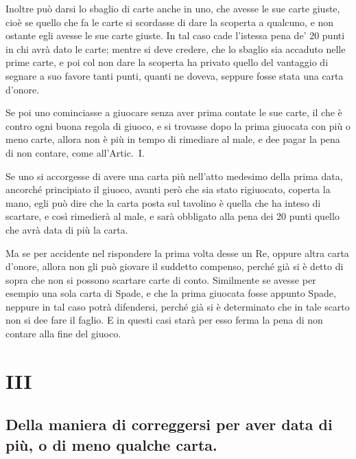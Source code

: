\documentclass[11pt,a6paper]{article}
\begin{document}
Inoltre può darsi lo sbaglio di carte anche in uno, che avesse le sue carte giuste, cioè se quello che fa le carte si scordasse di dare la scoperta a qualcuno, e non ostante egli avesse le sue carte giuste. In tal caso cade l'istessa pena de' 20 punti in chi avrà dato le carte; mentre si deve credere, che lo sbaglio sia accaduto nelle prime carte, e poi col non dare la scoperta ha privato quello del vantaggio di segnare a suo favore tanti punti, quanti ne doveva, seppure fosse stata una carta d'onore.

Se poi uno cominciasse a giuocare senza aver prima contate le sue carte, il che è contro ogni buona regola di giuoco, e si trovasse dopo la prima giuocata con più o meno carte, allora non è
più in tempo di rimediare al male, e dee pagar la pena di non contare, come all'Artic.\ I.

Se uno si accorgesse di avere una carta più nell'atto medesimo della prima data, ancorché principiato il giuoco, avanti però che sia stato rigiuocato, coperta la mano, egli può dire che la carta posta sul tavolino è quella che ha inteso di scartare, e così rimedierà al male, e sarà obbligato alla pena dei 20 punti quello che avrà data di più la carta.

Ma se per accidente nel rispondere la prima volta desse un Re, oppure altra carta d'onore, allora non gli può giovare il suddetto compenso, perché già si è detto di sopra che non si possono scartare carte di conto. Similmente se avesse per esempio una sola carta di Spade, e che la prima giuocata fosse appunto Spade, neppure in tal caso potrà difendersi, perché già si è determinato che in tale scarto non si dee fare il faglio. E in questi casi starà per esso ferma la pena di non contare alla fine del giuoco.

\section{III}
\subsection*{Della maniera di correggersi per aver data di più, o di meno qualche
carta.}
\end{document}
